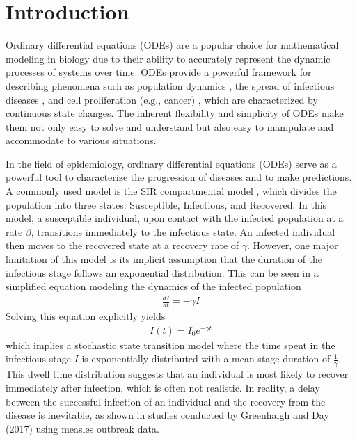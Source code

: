 \documentclass[12pt]{article}
\begin{document}
\section{Introduction}
Ordinary differential equations (ODEs) are a popular choice for mathematical modeling in biology due to their ability to accurately represent the dynamic processes of systems over time. ODEs provide a powerful framework for describing phenomena such as population dynamics \cite{salisbury2011mathematical}\cite{sego2021generation}, the spread of infectious diseases \cite{Anderson1991}\cite{Diekmann2000}\cite{Feng2016}, and cell proliferation (e.g., cancer) \cite{baker1998modelling}\cite{jarrett2018mathematical}, which are characterized by continuous state changes. The inherent flexibility and simplicity of ODEs make them not only easy to solve and understand but also easy to manipulate and accommodate to various situations.

In the field of epidemiology, ordinary differential equations (ODEs) serve as a powerful tool to characterize the progression of diseases and to make predictions. A commonly used model is the SIR compartmental model \cite{Anderson1991}\cite{kermack1927contribution}, which divides the population into three states: Susceptible, Infectious, and Recovered. In this model, a susceptible individual, upon contact with the infected population at a rate $\beta$, transitions immediately to the infectious state. An infected individual then moves to the recovered state at a recovery rate of $\gamma$. However, one major limitation of this model is its implicit assumption that the duration of the infectious stage follows an exponential distribution. This can be seen in a simplified equation modeling the dynamics of the infected population
\begin{align*}
    \frac{dI}{dt} = -\gamma I
\end{align*}
Solving this equation explicitly yields
\begin{align*}
    I(t) = I_0 e^{-\gamma t}
\end{align*}
which implies a stochastic state transition model where the time spent in the infectious stage $I$ is exponentially distributed with a mean stage duration of $\frac{1}{\gamma}$. This dwell time distribution suggests that an individual is most likely to recover immediately after infection, which is often not realistic. In reality, a delay between the successful infection of an individual and the recovery from the disease is inevitable, as shown in studies conducted by Greenhalgh and Day (2017) \cite{greenhalgh2017time} using measles outbreak data.
\end{document}
